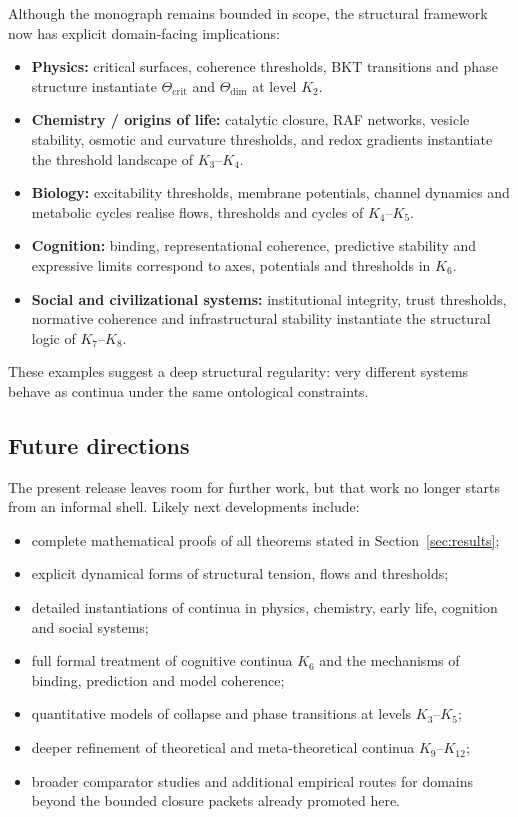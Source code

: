 Although the monograph remains bounded in scope, the structural framework now
has explicit domain-facing implications:

\begin{itemize}
    \item \textbf{Physics:} critical surfaces, coherence thresholds, BKT transitions and phase structure instantiate 
          \(\Theta_{\mathrm{crit}}\) and \(\Theta_{\mathrm{dim}}\) at level \(K_2\).
    \item \textbf{Chemistry / origins of life:} catalytic closure, RAF networks, vesicle stability, 
          osmotic and curvature thresholds, and redox gradients instantiate the threshold landscape of \(K_3\)–\(K_4\).
    \item \textbf{Biology:} excitability thresholds, membrane potentials, channel dynamics and 
          metabolic cycles realise flows, thresholds and cycles of \(K_4\)–\(K_5\).
    \item \textbf{Cognition:} binding, representational coherence, predictive stability and expressive limits 
          correspond to axes, potentials and thresholds in \(K_6\).
    \item \textbf{Social and civilizational systems:} institutional integrity, trust thresholds, 
          normative coherence and infrastructural stability instantiate the structural logic of \(K_7\)–\(K_8\).
\end{itemize}

These examples suggest a deep structural regularity:  
very different systems behave as continua under the same ontological constraints.

\subsection{Future directions}

The present release leaves room for further work, but that work no longer
starts from an informal shell. Likely next developments include:

\begin{itemize}
    \item complete mathematical proofs of all theorems stated in Section~\ref{sec:results};
    \item explicit dynamical forms of structural tension, flows and thresholds;
    \item detailed instantiations of continua in physics, chemistry, early life, cognition and social systems;
    \item full formal treatment of cognitive continua \(K_6\) and the mechanisms of binding, prediction and model coherence;
    \item quantitative models of collapse and phase transitions at levels \(K_3\)–\(K_5\);
    \item deeper refinement of theoretical and meta-theoretical continua \(K_9\)–\(K_{12}\);
    \item broader comparator studies and additional empirical routes for domains beyond the bounded closure packets already promoted here.
\end{itemize}


